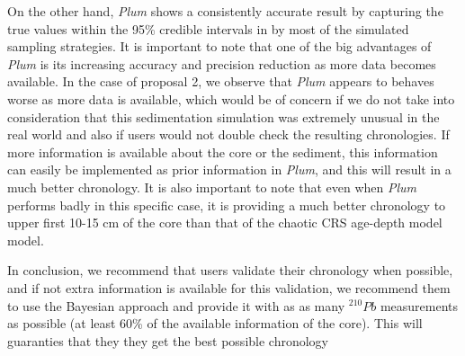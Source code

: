 \documentclass [10pt] {article}
\begin{document}
On the other hand, \textit{Plum} shows a consistently accurate result by capturing the true values within the 95\% credible intervals in by most of the simulated sampling strategies. 
It is important to note that one of the big advantages of \textit{Plum} is its increasing accuracy and precision reduction as more data becomes available.
In the case of proposal 2, we observe that \textit{Plum} appears to behaves worse as more data is available, which would be of concern if we do not take into consideration that this sedimentation simulation was extremely unusual in the real world and also if users would not double check the resulting chronologies. 
If more information is available about the core or the sediment, this information can easily be implemented as prior information in \textit{Plum}, and this will result in a much better chronology.
It is also important to note that even when \textit{Plum} performs badly in this specific case, it is providing a much better chronology to upper first 10-15 cm of the core than that of the chaotic CRS age-depth model model.

In conclusion, we recommend that users validate their chronology when possible, and if not extra information is available for this validation, we recommend them to use the Bayesian approach and provide it with as as many $^{210}Pb$ measurements as possible (at least 60\% of the available information of the core).  
This will guaranties that they they get the best possible chronology






\newpage
\end{document}

